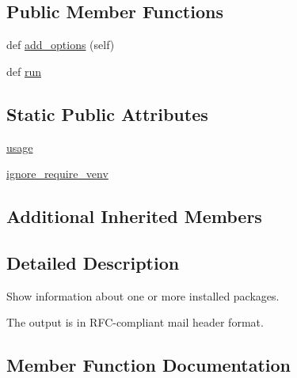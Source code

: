 \subsection*{Public Member Functions}
\begin{DoxyCompactItemize}
\item 
def \hyperlink{classpip_1_1__internal_1_1commands_1_1show_1_1ShowCommand_ae4a0e8402e2675d2489dfcb1606559c6}{add\+\_\+options} (self)
\item 
def \hyperlink{classpip_1_1__internal_1_1commands_1_1show_1_1ShowCommand_a15103579e82922510d0e87d2a0033eda}{run}
\end{DoxyCompactItemize}
\subsection*{Static Public Attributes}
\begin{DoxyCompactItemize}
\item 
\hyperlink{classpip_1_1__internal_1_1commands_1_1show_1_1ShowCommand_aef2b52f44b1d473e5bd4d2238972fd71}{usage}
\item 
\hyperlink{classpip_1_1__internal_1_1commands_1_1show_1_1ShowCommand_af59d5ba78e1d1910cdfd612ca7fc4855}{ignore\+\_\+require\+\_\+venv}
\end{DoxyCompactItemize}
\subsection*{Additional Inherited Members}


\subsection{Detailed Description}
\begin{DoxyVerb}Show information about one or more installed packages.

The output is in RFC-compliant mail header format.
\end{DoxyVerb}
 

\subsection{Member Function Documentation}
\mbox{\label{classpip_1_1__internal_1_1commands_1_1show_1_1ShowCommand_ae4a0e8402e2675d2489dfcb1606559c6}} 
